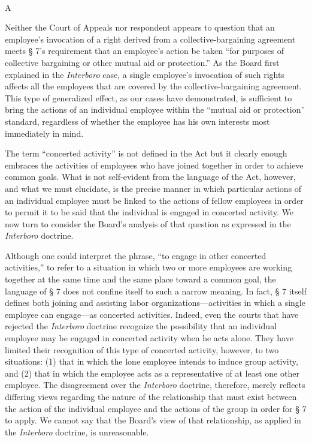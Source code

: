 \documentclass[
  letterpaper,
  11pt,
  DIV=9,
  openright]{scrbook}
\makeatletter
\let\oldparagraph\paragraph
\renewcommand{\paragraph}{
    \@ifstar
      \xxxParagraphStar
      \xxxParagraphNoStar
  }
\newcommand{\xxxParagraphStar}[1]{\oldparagraph*{#1}\mbox{}}
\newcommand{\xxxParagraphNoStar}[1]{\oldparagraph{#1}\mbox{}}
\makeatother
\begin{document}
\paragraph{A}\label{a}

Neither the Court of Appeals nor respondent appears to question that an
employee's invocation of a right derived from a collective-bargaining
agreement meets § 7's requirement that an employee's action be taken
``for purposes of collective bargaining or other mutual aid or
protection.'' As the Board first explained in the \emph{Interboro} case,
a single employee's invocation of such rights affects all the employees
that are covered by the collective-bargaining agreement. This type of
generalized effect, as our cases have demonstrated, is sufficient to
bring the actions of an individual employee within the ``mutual aid or
protection'' standard, regardless of whether the employee has his own
interests most immediately in mind.

The term ``concerted activity'' is not defined in the Act but it clearly
enough embraces the activities of employees who have joined together in
order to achieve common goals. What is not self-evident from the
language of the Act, however, and what we must elucidate, is the precise
manner in which particular actions of an individual employee must be
linked to the actions of fellow employees in order to permit it to be
said that the individual is engaged in concerted activity. We now turn
to consider the Board's analysis of that question as expressed in the
\emph{Interboro} doctrine.

Although one could interpret the phrase, ``to engage in other concerted
activities,'' to refer to a situation in which two or more employees are
working together at the same time and the same place toward a common
goal, the language of § 7 does not confine itself to such a narrow
meaning. In fact, § 7 itself defines both joining and assisting labor
organizations---activities in which a single employee can engage---as
concerted activities. Indeed, even the courts that have rejected the
\emph{Interboro} doctrine recognize the possibility that an individual
employee may be engaged in concerted activity when he acts alone. They
have limited their recognition of this type of concerted activity,
however, to two situations: (1) that in which the lone employee intends
to induce group activity, and (2) that in which the employee acts as a
representative of at least one other employee. The disagreement over the
\emph{Interboro} doctrine, therefore, merely reflects differing views
regarding the nature of the relationship that must exist between the
action of the individual employee and the actions of the group in order
for § 7 to apply. We cannot say that the Board's view of that
relationship, as applied in the \emph{Interboro} doctrine, is
unreasonable.
\end{document}
